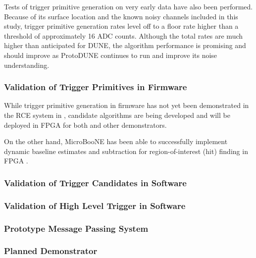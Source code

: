 Tests of trigger primitive generation on very early  data have also been
performed. Because of its surface
location and the known noisy channels included in this study,
 trigger primitive generation rates level off to a floor rate higher than a threshold
of approximately 16 ADC counts. Although the total rates are much higher than
anticipated for DUNE, the algorithm performance is promising and should improve as ProtoDUNE  continues
to run and improve its noise understanding.

\subsubsection{Validation of Trigger Primitives in Firmware}
\label{sec:sp-daq:validation-firmware-trigger-primitives}

While trigger primitive generation in firmware has not yet been
demonstrated in the RCE system in , candidate
algorithms are being developed and will be deployed in FPGA
for both  and other demonstrators. 

On the other hand, MicroBooNE has been able to
successfully implement dynamic baseline estimates and subtraction
for region-of-interest (hit) finding in FPGA \cite{NNN18}.

\subsubsection{Validation of Trigger Candidates in Software}


\subsubsection{Validation of High Level Trigger in Software}


\subsubsection{Prototype Message Passing System}
\label{sec:fd-daq:validation-demonstrators}



\subsubsection{Planned   Demonstrator}
\label{sec:sp-daq:validation-pd-demonstrator}

